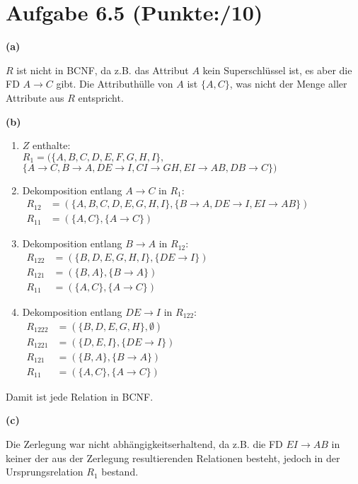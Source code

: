 \documentclass[11pt, a4paper]{article}
\newcommand{\blattnummer}{6}
\newcommand{\ppppp}{10}
\newcommand{\rA}{\rightarrow}
\newcommand{\aufgabe}[2] {\section*{Aufgabe \blattnummer.#1 (Punkte:\qquad/#2)}}
\newcommand{\aufgabenteil}[1] {\textbf{(#1)}}
\begin{document}
\aufgabe{5}{\ppppp}
\aufgabenteil{a}
\begin{adjustwidth}{20pt}{20pt}
$R$ ist nicht in BCNF, da z.B. das Attribut $A$ kein Superschlüssel ist, es aber die FD $A \rA C$ gibt. Die Attributhülle von $A$ ist $\{A, C\}$, was nicht der Menge aller Attribute aus $R$ entspricht.
\end{adjustwidth}
\aufgabenteil{b}
\begin{adjustwidth}{20pt}{20pt}

\begin{enumerate}
\item $Z$ enthalte:\\
	$R_1=(\{A, B, C, D, E, F, G, H, I \},$\\
	$\{A \rA C, B \rA A, DE \rA I, CI \rA GH, EI \rA AB, DB \rA C\})$\\

\item Dekomposition entlang $A \rA C$ in $R_1$:\\
	$\begin{aligned}
	R_{12}&=(\{A, B, C, D, E, G, H, I\}, \{B \rA A, DE \rA I, EI \rA AB\})\\
	R_{11}&=(\{A, C\}, \{A \rA C\})
	\end{aligned}$\\
	
\item Dekomposition entlang $B \rA A$ in $R_{12}$:\\
	$\begin{aligned}
	R_{122}&=(\{B, D, E, G, H, I\}, \{DE \rA I\})\\
	R_{121}&=(\{B, A\}, \{B \rA A\})\\
	R_{11}&=(\{A, C\}, \{A \rA C\})
	\end{aligned}$\\
	
\item Dekomposition entlang $DE \rA I$ in $R_{122}$:\\
	$\begin{aligned}
	R_{1222}&=(\{B, D, E, G, H\}, \emptyset)\\
	R_{1221}&=(\{D, E, I\}, \{DE \rA I\})\\
	R_{121}&=(\{B, A\}, \{B \rA A\})\\
	R_{11}&=(\{A, C\}, \{A \rA C\})
	\end{aligned}$\\

\end{enumerate}
Damit ist jede Relation in BCNF.
\end{adjustwidth}
\aufgabenteil{c}
\begin{adjustwidth}{20pt}{20pt}
Die Zerlegung war nicht abhängigkeitserhaltend, da z.B. die FD $EI \rA AB$ in keiner der aus der Zerlegung resultierenden Relationen besteht, jedoch in der Ursprungsrelation $R_1$ bestand.
\end{adjustwidth}



\end{document}
